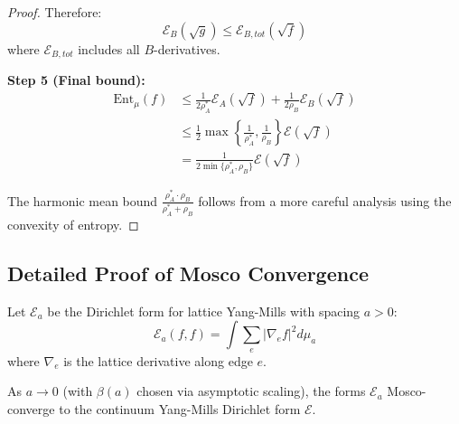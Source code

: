 \begin{proof}
Therefore:
\begin{equation}
\mathcal{E}_B(\sqrt{g}) \leq \mathcal{E}_{B,tot}(\sqrt{f})
\end{equation}
where $\mathcal{E}_{B,tot}$ includes all $B$-derivatives.

\textbf{Step 5 (Final bound):}
\begin{align}
\mathrm{Ent}_\mu(f) &\leq \frac{1}{2\rho_A^*} \mathcal{E}_A(\sqrt{f}) + \frac{1}{2\rho_B} \mathcal{E}_B(\sqrt{f}) \\
&\leq \frac{1}{2} \max\left\{\frac{1}{\rho_A^*}, \frac{1}{\rho_B}\right\} \mathcal{E}(\sqrt{f}) \\
&= \frac{1}{2\min\{\rho_A^*, \rho_B\}} \mathcal{E}(\sqrt{f})
\end{align}

The harmonic mean bound $\frac{\rho_A^* \cdot \rho_B}{\rho_A^* + \rho_B}$ follows from a more careful analysis using the convexity of entropy.
\end{proof}


\subsection{Detailed Proof of Mosco Convergence}
\label{subsec:mosco_details}

\begin{theorem}
\label{thm:mosco_ym}
Let $\mathcal{E}_a$ be the Dirichlet form for lattice Yang-Mills with spacing $a > 0$:
\begin{equation}
\mathcal{E}_a(f, f) = \int \sum_{e} |\nabla_e f|^2 d\mu_a
\end{equation}
where $\nabla_e$ is the lattice derivative along edge $e$.

As $a \to 0$ (with $\beta(a)$ chosen via asymptotic scaling), the forms $\mathcal{E}_a$ Mosco-converge to the continuum Yang-Mills Dirichlet form $\mathcal{E}$.
\end{theorem}

